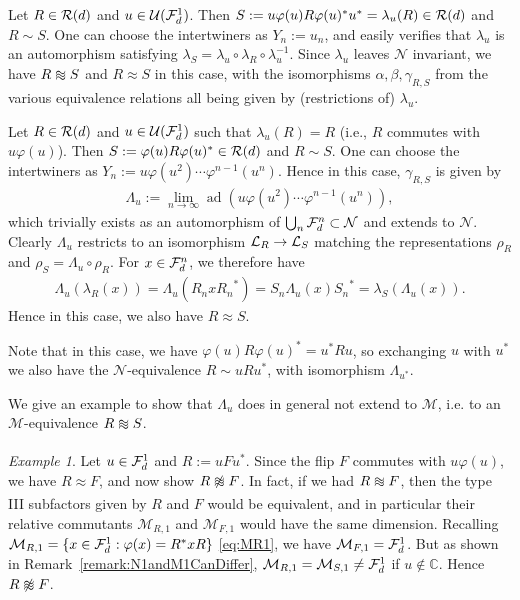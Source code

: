 \documentclass[12pt,a4paper]{amsart}
\numberwithin{equation}{section}
\theoremstyle{remark}
\newtheorem{example}[theorem]{Example}
\DeclareMathOperator{\ad}{ad}
\newcommand{\Cl}{\mathbb{C}}
\newcommand{\la}{\lambda}
\newcommand{\CM}[0]{\mathcal{M}} \newcommand{\CN}[0]{\mathcal{N}}
\newcommand{\CU}[0]{\mathcal{U}} \newcommand{\CV}[0]{\mathcal{V}}
\def\apeqA{\SavedStyle\sim}
\def\Msim{\setstackgap{L}{\dimexpr.5pt+1.5\LMpt}\ensurestackMath{%
  \ThisStyle{\mathrel{\Centerstack{{\apeqA} {\apeqA} {\apeqA}}}}}}
\def\Nsim{\approx}
\begin{document}
\begin{description}\label{page:types}
	\item[Type 1] Let $R\in\mathcal{R}(d)$ and $u\in\CU(\CF_d^1)$. Then $S:=u\varphi(u)R\varphi(u)^*u^*=\la_u(R)\in\CR(d)$ and $R\sim S$. One can choose the intertwiners as $Y_n:=u_n$, and easily verifies that $\la_u$ is an automorphism satisfying $\la_S=\la_u\circ\la_R\circ\la_u^{-1}$. Since $\la_u$ leaves $\CN$ invariant, we have $R\Msim S$ and $R\Nsim S$ in this case, with the isomorphisms $\alpha,\beta,\gamma_{R,S}$ from the various equivalence relations all being given by (restrictions of) $\la_u$.
	
	\item[Type 2] Let $R\in\mathcal{R}(d)$ and $u\in\CU(\CF_d^1)$ such that $\la_u(R)=R$ (i.e., $R$ commutes with $u\varphi(u)$). Then $S:=\varphi(u)R\varphi(u)^*\in\mathcal{R}(d)$ and $R\sim S$. One can choose the intertwiners as $Y_n:=u\varphi(u^2)\cdots\varphi^{n-1}(u^n)$. Hence in this case, $\gamma_{R,S}$ is given by 
	\begin{align}
		\Lambda_u:=\lim_{n\to\infty}{\ad}(u\varphi(u^2)\cdots\varphi^{n-1}(u^n)),
	\end{align}
	which trivially exists as an automorphism of $\bigcup_n\CF_d^n\subset\CN$ and extends to $\CN$. Clearly $\Lambda_u$ restricts to an isomorphism $\mathcal{L}_R\to\mathcal{L}_S$ matching the representations $\rho_R$ and $\rho_S=\Lambda_u\circ\rho_R$. For $x\in\mathcal{F}_d^n$, we therefore have
	\begin{align*}
	 \Lambda_u(\la_R(x))
	 =
	 \Lambda_u(R_nx{R_n}^*)
	 =
	 S_n\Lambda_u(x){S_n}^*
	 =
	 \la_S(\Lambda_u(x)).
	\end{align*}
	Hence in this case, we also have $R\Nsim S$.
	
	Note that in this case, we have $\varphi(u)R\varphi(u)^*=u^*Ru$, so exchanging $u$ with $u^*$ we also have the $\CN$-equivalence $R\sim uRu^*$, with isomorphism $\Lambda_{u^*}$.
	
	We give an example to show that $\Lambda_u$ does in general not extend to $\CM$, i.e. to an $\CM$-equivalence $R\Msim S$.
	
	\begin{example}
		Let $u\in\mathcal{F}_d^1$ and $R:=uFu^*$. Since the flip $F$ commutes with $u\varphi(u)$, we have $R\Nsim F$, and now show $R\not\Msim F$. In fact, if we had $R\Msim F$, then the type III subfactors given by $R$ and $F$ would be equivalent, and in particular their relative commutants $\CM_{R,1}$ and $\CM_{F,1}$ would have the same dimension. Recalling $\CM_{R,1}=\{x\in\CF_d^1:\varphi(x)=R^*xR\}$ \eqref{eq:MR1}, we have $\CM_{F,1}=\CF_d^1$. But as shown in Remark~\ref{remark:N1andM1CanDiffer}, $\CM_{R,1}=\CM_{S,1}\neq\CF_d^1$ if $u\not\in\Cl$. Hence $R\not\Msim F$.
	\end{example}



\end{description}
\end{document}

